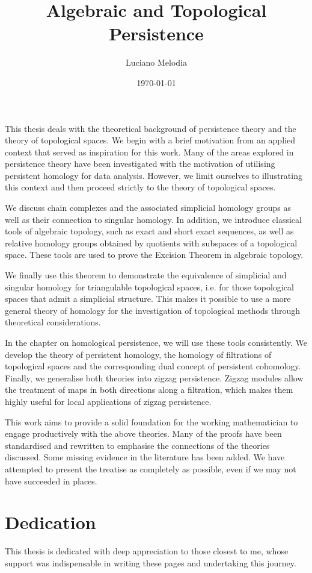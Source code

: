 \documentclass[b5paper, 12pt, twoside]{report}
\title{Algebraic and Topological Persistence}
\author{Luciano Melodia}
\date{\today}
\begin{document}
	
	
This thesis deals with the theoretical background of persistence theory and the theory of topological spaces. We begin with a brief motivation from an applied context that served as inspiration for this work. Many of the areas explored in persistence theory have been investigated with the motivation of utilising persistent homology for data analysis. However, we limit ourselves to illustrating this context and then proceed strictly to the theory of topological spaces.

We discuss chain complexes and the associated simplicial homology groups as well as their connection to singular homology. In addition, we introduce classical tools of algebraic topology, such as exact and short exact sequences, as well as relative homology groups obtained by quotients with subspaces of a topological space. These tools are used to prove the Excision Theorem in algebraic topology.

We finally use this theorem to demonstrate the equivalence of simplicial and singular homology for triangulable topological spaces, i.e. for those topological spaces that admit a simplicial structure. This makes it possible to use a more general theory of homology for the investigation of topological methods through theoretical considerations.

In the chapter on homological persistence, we will use these tools consistently. We develop the theory of persistent homology, the homology of filtrations of topological spaces and the corresponding dual concept of persistent cohomology. Finally, we generalise both theories into zigzag persistence. Zigzag modules allow the treatment of maps in both directions along a filtration, which makes them highly useful for local applications of zigzag persistence.

This work aims to provide a solid foundation for the working mathematician to engage productively with the above theories. Many of the proofs have been standardised and rewritten to emphasise the connections of the theories discussed. Some missing evidence in the literature has been added. We have attempted to present the treatise as completely as possible, even if we may not have succeeded in places.
	\chapter*{Dedication}

	This thesis is dedicated with deep appreciation to those closest to me, whose support was indispensable in writing these pages and undertaking this journey.
\end{document}
